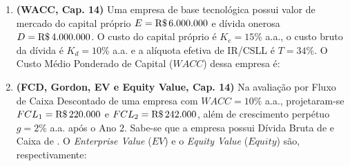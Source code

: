 \begin{enumerate}[leftmargin=1.6em, itemsep=8pt]
  \item \textbf{(WACC, Cap. 14)} Uma empresa de base tecnológica possui valor de mercado do capital próprio $E = \text{R\$\,}{6.000.000}$ e dívida onerosa $D = \text{R\$\,}{4.000.000}$. O custo do capital próprio é $K_e = 15\%$ a.a., o custo bruto da dívida é $K_d = 10\%$ a.a. e a alíquota efetiva de IR/CSLL é $T = 34\%$. O Custo Médio Ponderado de Capital ($WACC$) dessa empresa é:

  \item \textbf{(FCD, Gordon, EV e Equity Value, Cap. 14)} Na avaliação por Fluxo de Caixa Descontado de uma empresa com $WACC = 10\%$ a.a., projetaram-se $FCL_1 = \text{R\$\,}{220.000}$ e $FCL_2 = \text{R\$\,}{242.000}$, além de crescimento perpétuo $g = 2\%$ a.a. após o Ano $2$. Sabe-se que a empresa possui Dívida Bruta de  e Caixa de . O \textit{Enterprise Value} ($EV$) e o \textit{Equity Value} ($Equity$) são, respectivamente:


\end{enumerate}
